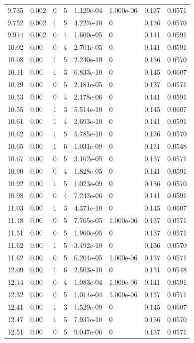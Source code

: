 \documentclass[preview]{standalone}
\begin{document}
{{{\begin{tabular}{L{1.2cm}C{1.2cm} C{0.3cm}C{0.5cm} C{1.4cm}C{1.4cm} C{1.4cm}C{1.4cm}}
  9.735  &  0.002  & 0     &  5 &  1.129e-04  & 1.000e-06  & 0.137 &  0.0571   \\ 
  9.752  &  0.002  & 1     &  5 &  4.227e-10  & 0  & 0.136 &  0.0570   \\ 
  9.914  &  0.002  & 0     &  4 &  1.600e-05  & 0  & 0.141 &  0.0591   \\ 
  10.02  &  0.00  & 0     &  4 &  2.701e-05  & 0  & 0.141 &  0.0591   \\ 
  10.08  &  0.00  & 1     &  5 &  2.240e-10  & 0  & 0.136 &  0.0570   \\ 
  10.11  &  0.00  & 1     &  3 &  6.833e-10  & 0  & 0.145 &  0.0607   \\ 
  10.29  &  0.00  & 0     &  5 &  2.181e-05  & 0  & 0.137 &  0.0571   \\ 
  10.53  &  0.00  & 0     &  4 &  2.178e-06  & 0  & 0.141 &  0.0591   \\ 
  10.55  &  0.00  & 1     &  3 &  5.514e-10  & 0  & 0.145 &  0.0607   \\ 
  10.61  &  0.00  & 1     &  4 &  2.693e-10  & 0  & 0.141 &  0.0591   \\ 
  10.62  &  0.00  & 1     &  5 &  5.785e-10  & 0  & 0.136 &  0.0570   \\ 
  10.65  &  0.00  & 1     &  6 &  1.031e-09  & 0  & 0.131 &  0.0548   \\ 
  10.67  &  0.00  & 0     &  5 &  3.162e-05  & 0  & 0.137 &  0.0571   \\ 
  10.90  &  0.00  & 0     &  4 &  1.828e-05  & 0  & 0.141 &  0.0591   \\ 
  10.92  &  0.00  & 1     &  5 &  1.023e-09  & 0  & 0.136 &  0.0570   \\ 
  10.98  &  0.00  & 0     &  4 &  7.242e-06  & 0  & 0.141 &  0.0591   \\ 
  11.03  &  0.00  & 1     &  3 &  4.371e-10  & 0  & 0.145 &  0.0607   \\ 
  11.18  &  0.00  & 0     &  5 &  7.765e-05  & 1.000e-06  & 0.137 &  0.0571   \\ 
  11.51  &  0.00  & 0     &  5 &  1.960e-05  & 0  & 0.137 &  0.0571   \\ 
  11.62  &  0.00  & 1     &  5 &  3.492e-10  & 0  & 0.136 &  0.0570   \\ 
  11.62  &  0.00  & 0     &  5 &  6.204e-05  & 1.000e-06  & 0.137 &  0.0571   \\ 
  12.09  &  0.00  & 1     &  6 &  2.503e-10  & 0  & 0.131 &  0.0548   \\ 
  12.14  &  0.00  & 0     &  4 &  1.083e-04  & 1.000e-06  & 0.141 &  0.0591   \\ 
  12.32  &  0.00  & 0     &  5 &  1.014e-04  & 1.000e-06  & 0.137 &  0.0571   \\ 
  12.41  &  0.00  & 1     &  3 &  1.529e-09  & 0  & 0.145 &  0.0607   \\ 
  12.47  &  0.00  & 1     &  5 &  7.937e-10  & 0  & 0.136 &  0.0570   \\ 
  12.51  &  0.00  & 0     &  5 &  9.047e-06  & 0  & 0.137 &  0.0571   \\ 
\hline 
\end{tabular} 

}}}
\end{document}
